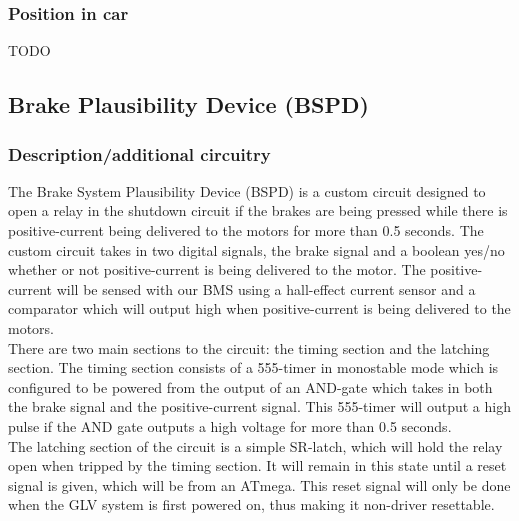 \documentclass{article}
\begin{document}
\subsubsection{Position in car}
TODO

\subsection{Brake Plausibility Device (BSPD)}\label{brake_plausibility_device}
\subsubsection{Description/additional circuitry}

The Brake System Plausibility Device (BSPD) is a custom circuit designed to open a relay in the shutdown circuit if the brakes are being pressed while there is positive-current being delivered to the motors for more than 0.5 seconds. The custom circuit takes in two digital signals, the brake signal and a boolean yes/no whether or not positive-current is being delivered to the motor. The positive-current will be sensed with our BMS using a hall-effect current sensor and a comparator which will output high when positive-current is being delivered to the motors. \\

There are two main sections to the circuit: the timing section and the latching section. The timing section consists of a 555-timer in monostable mode which is configured to be powered from the output of an AND-gate which takes in both the brake signal and the positive-current signal. This 555-timer will output a high pulse if the AND gate outputs a high voltage for more than 0.5 seconds. \\

The latching section of the circuit is a simple SR-latch, which will hold the relay open when tripped by the timing section. It will remain in this state until a reset signal is given, which will be from an ATmega. This reset signal will only be done when the GLV system is first powered on, thus making it non-driver resettable. \\
\end{document}
